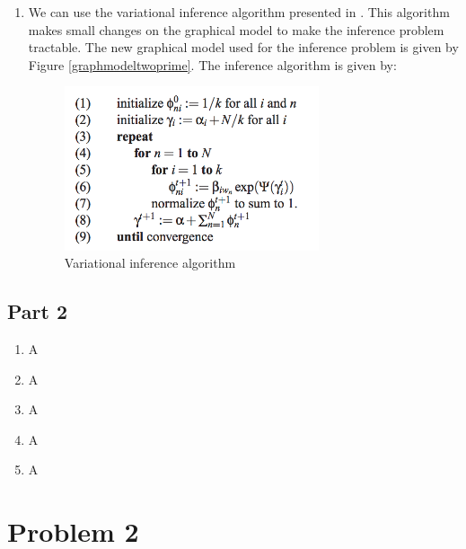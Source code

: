 \documentclass{article}
\begin{document}
\begin{enumerate}
\begin{enumerate}
\item
We can use the variational inference algorithm presented in \cite{lda}. This algorithm makes small changes on the graphical model to make the inference problem tractable. The new graphical model used for the inference problem is given by Figure \ref{graphmodeltwoprime}. The inference algorithm \cite{lda} is given by:
\begin{figure}[ht!]
\centering
\includegraphics[width=75mm]{1_1_2inf.png}
\caption{Variational inference algorithm}
\label{varinfalgorithm}
\end{figure}

\end{enumerate}

\end{enumerate}

\newpage
\subsection*{Part 2}

\begin{enumerate}
\item A\\
\item A\\
\item A\\
\item A\\
\item A\\

\end{enumerate}


\newpage

\section*{Problem 2}
\end{document}
